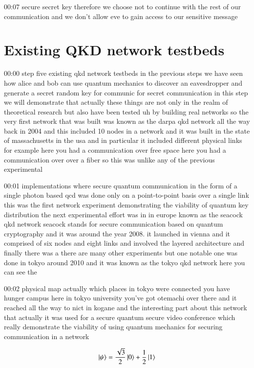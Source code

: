 00:07
secure secret key therefore we choose not to continue
with the rest of our communication and we don't allow eve to gain access to our
sensitive message

\section{Existing QKD network testbeds}


00:00
step five existing qkd network testbeds in the previous steps we have seen how
alice and bob can use quantum mechanics to discover an eavesdropper and generate
a secret random key for communic for secret communication
in this step we will demonstrate that actually these things are not only
in the realm of theoretical research but also have been tested
uh by building real networks so the very first network that was built
was known as the darpa qkd network all the way back in 2004 and this included
10 nodes in a network and it was built in the state of massachusetts in the usa
and in particular it included different physical links for example
here you had a communication over free space here you had a communication
over over a fiber so this was unlike any of the previous experimental

00:01
implementations where secure quantum communication
in the form of a single photon based qcd was done
only on a point-to-point basis over a single link
this was the first network experiment demonstrating the viability of quantum
key distribution the next experimental effort was in
in europe known as the seacock qkd network
seacock stands for secure communication based on quantum cryptography
and it was around the year 2008. it launched
in vienna and it comprised of six nodes and eight links and involved the layered
architecture and finally there was a there are many
other experiments but one notable one was done in tokyo around
2010 and it was known as the tokyo qkd network here you can see the

00:02
physical map actually which places in tokyo were connected
you have hunger campus here in tokyo university
you've got otemachi over there and it reached all the way to nict in kogane
and the interesting part about this network that actually it was used
for a secure quantum secure video conference which really demonstrate
the viability of using quantum mechanics for securing communication in a network



\newpage
\begin{exercises}
\begin{equation*}
\ket{\psi} = \frac{\sqrt{3}}{2}\ket{0} + \frac{1}{2}\ket{1}
\end{equation*}


\end{exercises}

